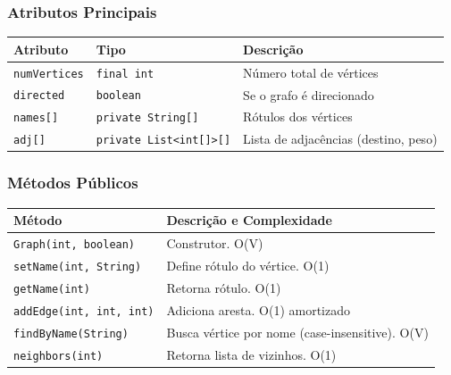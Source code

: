 \documentclass[12pt,a4paper]{article}
\begin{document}
    \subsubsection{Atributos Principais}

    \begin{table}[h]
        \centering
        \begin{tabular}{|l|l|l|}
            \hline
            \textbf{Atributo} & \textbf{Tipo} & \textbf{Descrição} \\
            \hline
            \texttt{numVertices} & \texttt{final int} & Número total de vértices \\
            \hline
            \texttt{directed} & \texttt{boolean} & Se o grafo é direcionado \\
            \hline
            \texttt{names[]} & \texttt{private String[]} & Rótulos dos vértices \\
            \hline
            \texttt{adj[]} & \texttt{private List<int[]>[]} & Lista de adjacências (destino, peso) \\
            \hline
        \end{tabular}
    \end{table}

    \subsubsection{Métodos Públicos}

    \begin{table}[h]
        \centering
        \begin{tabular}{|l|l|}
            \hline
            \textbf{Método} & \textbf{Descrição e Complexidade} \\
            \hline
            \texttt{Graph(int, boolean)} & Construtor. O(V) \\
            \hline
            \texttt{setName(int, String)} & Define rótulo do vértice. O(1) \\
            \hline
            \texttt{getName(int)} & Retorna rótulo. O(1) \\
            \hline
            \texttt{addEdge(int, int, int)} & Adiciona aresta. O(1) amortizado \\
            \hline
            \texttt{findByName(String)} & Busca vértice por nome (case-insensitive). O(V) \\
            \hline
            \texttt{neighbors(int)} & Retorna lista de vizinhos. O(1) \\
            \hline
        \end{tabular}
    \end{table}
\end{document}
